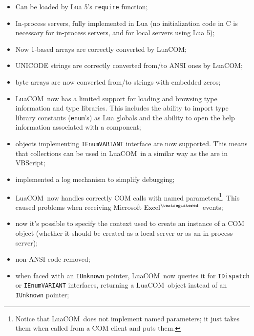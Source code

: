 \documentclass[11pt,a4paper,english]{report}
\newcommand{\ident}[1]{\mbox{\texttt{#1}}}
\newcommand{\techname}[1]{\mbox{#1}}
\newcommand{\luacom}{\techname{LuaCOM}}
\newcommand{\registered}{$^{\textregistered}$}
\begin{document}
\begin{itemize}

\item Can be loaded by Lua 5's \verb+require+ function;

\item In-process servers, fully implemented in Lua (no initialization code in C is necessary
for in-process servers, and for local servers using Lua 5);

\item Now 1-based arrays are correctly converted by \luacom;

\item UNICODE strings are correctly converted from/to ANSI ones by
LuaCOM;

\item byte arrays are now converted from/to strings with embedded zeros;

\item \luacom\ now has a limited support for loading and browsing type
information and type libraries. This includes the ability to import
type library constants (\ident{enum}'s) as Lua globals and the ability
to open the help information associated with a component;

\item objects implementing \ident{IEnumVARIANT} interface are now
supported. This means that collections can be used in \luacom\ in a
similar way as the are in VBScript\texttrademark;

\item implemented a log mechanism to simplify debugging;

\item \luacom\ now handles correctly COM calls with named
parameters\footnote{Notice that \luacom\ does not implement named
parameters; it just takes them when called from a COM client and
puts them.}. This caused problems when receiving Microsoft
Excel\registered\ events;

\item now it's possible to specify the context used to create an
instance of a COM object (whether it should be created as a local
server or as an in-process server);

\item non-ANSI code removed;

\item when faced with an \ident{IUnknown} pointer, \luacom\ now
queries it for \ident{IDispatch} or \ident{IEnumVARIANT} interfaces,
returning a \luacom\ object instead of an \ident{IUnknown} pointer;


\end{itemize}
\end{document}
